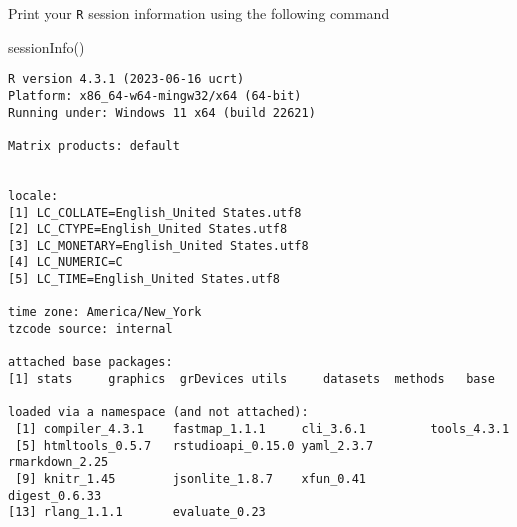 \documentclass[
  letterpaper,
  DIV=11,
  numbers=noendperiod]{scrartcl}
\newenvironment{Shaded}{\begin{snugshade}}{\end{snugshade}}
\newcommand{\FunctionTok}[1]{\textcolor[rgb]{0.28,0.35,0.67}{#1}}
\newcommand{\NormalTok}[1]{\textcolor[rgb]{0.00,0.23,0.31}{#1}}
\begin{document}
Print your \texttt{R} session information using the following command

\begin{Shaded}
\begin{Highlighting}[]
\FunctionTok{sessionInfo}\NormalTok{()}
\end{Highlighting}
\end{Shaded}

\begin{verbatim}
R version 4.3.1 (2023-06-16 ucrt)
Platform: x86_64-w64-mingw32/x64 (64-bit)
Running under: Windows 11 x64 (build 22621)

Matrix products: default


locale:
[1] LC_COLLATE=English_United States.utf8 
[2] LC_CTYPE=English_United States.utf8   
[3] LC_MONETARY=English_United States.utf8
[4] LC_NUMERIC=C                          
[5] LC_TIME=English_United States.utf8    

time zone: America/New_York
tzcode source: internal

attached base packages:
[1] stats     graphics  grDevices utils     datasets  methods   base     

loaded via a namespace (and not attached):
 [1] compiler_4.3.1    fastmap_1.1.1     cli_3.6.1         tools_4.3.1      
 [5] htmltools_0.5.7   rstudioapi_0.15.0 yaml_2.3.7        rmarkdown_2.25   
 [9] knitr_1.45        jsonlite_1.8.7    xfun_0.41         digest_0.6.33    
[13] rlang_1.1.1       evaluate_0.23    
\end{verbatim}
\end{document}

